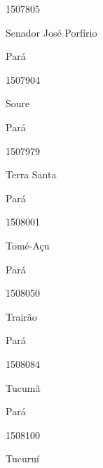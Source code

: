 \documentclass[
  letterpaper,
]{report}
\begin{document}
1507805

\n      

Senador José Porfírio

\n    

\n    

\n      

Pará

\n      

1507904

\n      

Soure

\n    

\n    

\n      

Pará

\n      

1507979

\n      

Terra Santa

\n    

\n    

\n      

Pará

\n      

1508001

\n      

Tomé-Açu

\n    

\n    

\n      

Pará

\n      

1508050

\n      

Trairão

\n    

\n    

\n      

Pará

\n      

1508084

\n      

Tucumã

\n    

\n    

\n      

Pará

\n      

1508100

\n      

Tucuruí

\n    

\n    
\end{document}
